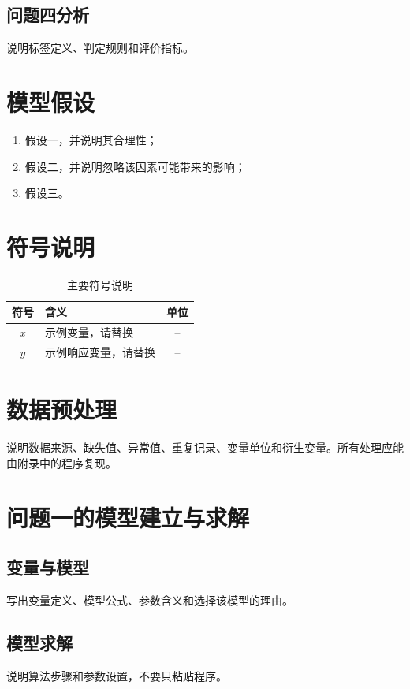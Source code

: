 \documentclass[UTF8,a4paper,12pt,fontset=fandol]{ctexart}
\begin{document}
\subsection{问题四分析}
说明标签定义、判定规则和评价指标。

\section{模型假设}
\begin{enumerate}
  \item 假设一，并说明其合理性；
  \item 假设二，并说明忽略该因素可能带来的影响；
  \item 假设三。
\end{enumerate}

\section{符号说明}
\begin{table}[H]
  \centering
  \caption{主要符号说明}
  \begin{tabularx}{\textwidth}{cXc}
    \toprule
    符号 & 含义 & 单位 \\
    \midrule
    $x$ & 示例变量，请替换 & -- \\
    $y$ & 示例响应变量，请替换 & -- \\
    \bottomrule
  \end{tabularx}
  \label{tab:symbols}
\end{table}

\section{数据预处理}
说明数据来源、缺失值、异常值、重复记录、变量单位和衍生变量。所有处理应能由附录中的程序复现。

\section{问题一的模型建立与求解}
\subsection{变量与模型}
写出变量定义、模型公式、参数含义和选择该模型的理由。

\subsection{模型求解}
说明算法步骤和参数设置，不要只粘贴程序。
\end{document}

